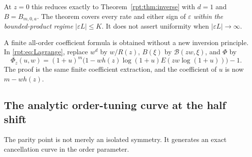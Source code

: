 \documentclass[11pt,a4paper]{article}
\numberwithin{equation}{section}
\theoremstyle{definition}\newtheorem{definition}[theorem]{Definition}
\theoremstyle{remark}\newtheorem{remark}[theorem]{Remark}
\newcommand{\eps}{\varepsilon}
\newcommand{\calB}{\mathscr B}
\begin{document}
At $z=0$ this reduces exactly to Theorem~\ref{rpt:thm:inverse} with $d=1$ and $B=B_{m,0,a}$. The theorem covers every rate and either sign of $\eps$ \emph{within the bounded-product regime} $|\eps L|\le K$. It does not assert uniformity when $|\eps L|\to\infty$.

A finite all-order coefficient formula is obtained without a new inversion principle. In \eqref{rpt:eq:Lagrange}, replace $w^d$ by $w/R(z)$, $B(\xi)$ by $\calB(zw,\xi)$, and $\Phi$ by
\[
\Phi_z(u,w)=(1+u)^m\bigl(1-wh(z)\log(1+u)E(zw\log(1+u))\bigr)-1.
\]
The proof is the same finite coefficient extraction, and the coefficient of $u$ is now $m-wh(z)$.

\subsection{The analytic order-tuning curve at the half shift}

The parity point is not merely an isolated symmetry. It generates an exact cancellation curve in the order parameter.
\end{document}
